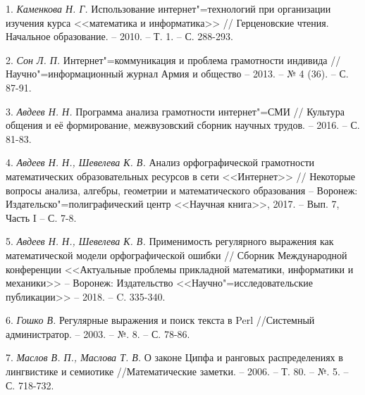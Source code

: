 1. {\it Каменкова Н. Г.}
 Использование интернет"=технологий при организации изучения курса <<математика и информатика>>
 // Герценовские чтения. Начальное образование. – 2010. – Т. 1. – С. 288-293.

2. {\it Сон Л. П.}
 Интернет"=коммуникация и проблема грамотности индивида // Научно"=информационный журнал \lb Армия и общество – 2013. – № 4 (36). – С. 87-91.

3. {\it Авдеев Н. Н.}
 Программа анализа грамотности интернет"=СМИ // Культура общения и её формирование, межвузовский сборник научных трудов. – 2016. – С. 81-83.

4. {\it Авдеев Н. Н., Шевелева К. В.}
 Анализ орфографической грамотности математических образовательных ресурсов в сети <<Интернет>> // Некоторые вопросы анализа,
 алгебры, геометрии и математического образования – Воронеж: Издательско"=полиграфический центр <<Научная книга>>, 2017. – Вып. 7, Часть I – С. 7-8.

5. {\it Авдеев Н. Н., Шевелева К. В.}
 Применимость регулярного выражения как математической модели орфографической ошибки // Сборник Международной конференции <<Актуальные
 проблемы прикладной математики, информатики и механики>> – Воронеж: Издательство <<Научно"=исследовательские публикации>> – 2018. – C. 335-340.

6. \textit{Гошко В.} Регулярные выражения и поиск текста в Perl //Системный администратор. – 2003. – №. 8. – С. 78-86.

7. \textit{Маслов В. П., Маслова Т. В.} О законе Ципфа и ранговых распределениях в лингвистике и семиотике //Математические заметки. – 2006. – Т. 80. – №. 5. – С. 718-732.

